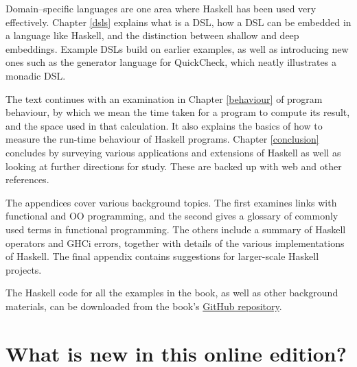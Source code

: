 Domain--specific languages are one area where Haskell has been used very effectively. Chapter \ref{dsls} explains what is a DSL, how a DSL can be embedded in a language like Haskell, and the distinction between shallow and deep embeddings. Example DSLs build on earlier examples, as well as introducing new ones such as the generator language for QuickCheck, which neatly illustrates a monadic DSL.

The text continues with an examination in Chapter \ref{behaviour} of program
behaviour, by which we mean the time taken for a program to compute its
result, and the space used in that calculation. It also explains the basics of how to measure the run-time behaviour of Haskell programs. Chapter \ref{conclusion} concludes 
by surveying various applications and extensions of Haskell as
well as looking at further directions for study. These are backed up
with web and other references.

The appendices cover various background topics. The first examines links
with functional and OO programming, and the second gives a glossary of
commonly used terms in functional programming. The others include a summary
of Haskell operators and GHCi errors, together with details of the various implementations of Haskell. The final appendix contains suggestions for larger-scale Haskell projects. 

The Haskell code for all the examples in the book, as well as other
background materials, can be downloaded from the book's \href{https://github.com/simonjohnthompson/haskellcraft}{GitHub repository}.


\section*{What is new in this online edition?}

